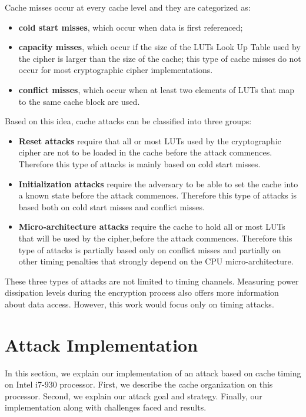\documentclass[twocolumn]{IEEEtran}
\begin{document}
Cache misses occur at every cache level and they are categorized as:

\begin {itemize}
\item \textbf{cold start misses}, which occur when data is first referenced;
\item \textbf{capacity misses}, which occur if the size of the LUTs Look Up Table used by the cipher is larger than the size of the cache; this type of cache misses do not occur for most cryptographic cipher implementations.
\item \textbf{conflict misses}, which occur when at least two elements of LUTs that map to the same cache block are used.
\end {itemize}

Based on this idea, cache attacks can be classified into three groups:

\begin {itemize}

\item \textbf{Reset attacks} require that all or most LUTs used by the cryptographic cipher are not to be loaded in the cache before the attack commences. Therefore this type of attacks is mainly based on cold start misses.

\item \textbf{Initialization attacks} require the adversary to be able to set the cache into a known state before the attack commences. Therefore this type of attacks is based both on cold start misses and conflict misses.

\item \textbf{Micro-architecture attacks} require the cache to hold all or most LUTs that will be used by the cipher,before the attack commences. Therefore this type of attacks is partially based only on conflict misses and partially on other timing penalties that
strongly depend on the CPU micro-architecture. 

\end {itemize}

These three types of attacks are not limited to timing channels. Measuring power dissipation levels during the encryption process also offers more information about data access. However, this work would focus only on timing attacks.

\section {Attack Implementation}
In this section, we explain our implementation of an attack based on cache timing on Intel i7-930 processor. First, we describe the cache organization on this processor. Second, we explain our attack goal and strategy. Finally, our implementation along with challenges faced and results.
\end{document}

